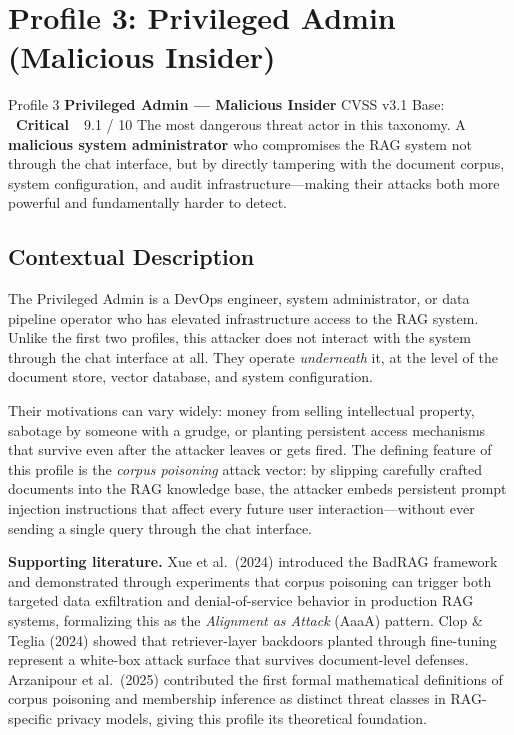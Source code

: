 \documentclass[12pt, a4paper]{report}
\newcommand{\badgecritical}{\colorbox{danger}{\color{white}\small\textbf{~Critical~}}}
\begin{document}
\newpage
\section{Profile 3: Privileged Admin (Malicious Insider)}

\begin{profilebanner}%
  {Profile 3 \enspace\textbf{Privileged Admin --- Malicious Insider}}%
  {CVSS v3.1 Base: \badgecritical\ 9.1 / 10}
  \small
  The most dangerous threat actor in this taxonomy. A \textbf{malicious
  system administrator} who compromises the RAG system not through the
  chat interface, but by directly tampering with the document corpus,
  system configuration, and audit infrastructure---making their attacks
  both more powerful and fundamentally harder to detect.
\end{profilebanner}

\subsection{Contextual Description}

\begin{prosebox}
The Privileged Admin is a DevOps engineer, system administrator, or data
pipeline operator who has elevated infrastructure access to the RAG system.
Unlike the first two profiles, this attacker does not interact with the
system through the chat interface at all. They operate \emph{underneath}
it, at the level of the document store, vector database, and system
configuration.

Their motivations can vary widely: money from selling intellectual property,
sabotage by someone with a grudge, or planting persistent access mechanisms
that survive even after the attacker leaves or gets fired.
The defining feature of this profile is the \emph{corpus poisoning} attack
vector: by slipping carefully crafted documents into the RAG knowledge base,
the attacker embeds persistent prompt injection instructions that affect
every future user interaction---without ever sending a single query through
the chat interface.

\medskip
\textbf{Supporting literature.}
Xue et al.\ (2024) introduced the BadRAG framework and demonstrated through
experiments that corpus poisoning can trigger both targeted data exfiltration
and denial-of-service behavior in production RAG systems, formalizing this as
the \emph{Alignment as Attack} (AaaA) pattern. Clop \& Teglia (2024)
showed that retriever-layer backdoors planted through fine-tuning represent
a white-box attack surface that survives document-level defenses.
Arzanipour et al.\ (2025) contributed the first formal mathematical
definitions of corpus poisoning and membership inference as distinct threat
classes in RAG-specific privacy models, giving this profile its theoretical
foundation.
\end{prosebox}
\end{document}
